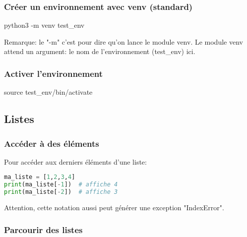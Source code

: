 \subsubsection{Créer un environnement avec venv (standard)}

\begin{terminal}
python3 -m venv test_env
\end{terminal}
Remarque: le "-m" c'est pour dire qu'on lance le module venv. Le module venv attend un argument: le nom de l'environnement (test\_env) ici.

\subsubsection{Activer l'environnement}

\begin{terminal}
source test_env/bin/activate
\end{terminal}

\subsection{Listes}

\subsubsection{Accéder à des éléments}

Pour accéder aux derniers éléments d'une liste:

\begin{lstlisting}[language=Python]
ma_liste = [1,2,3,4]
print(ma_liste[-1])  # affiche 4
print(ma_liste[-2])  # affiche 3
\end{lstlisting}

Attention, cette notation aussi peut générer une exception "IndexError".

\subsubsection{Parcourir des listes}

